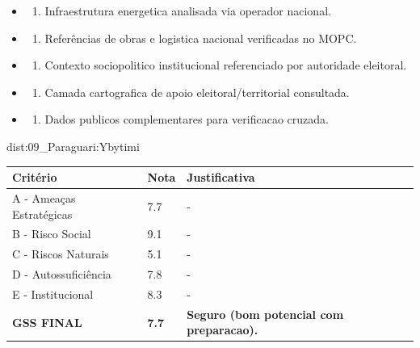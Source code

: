 {\begin{itemize}
\item
  \begin{enumerate}
  \def\labelenumi{\arabic{enumi})}
  \setcounter{enumi}{7}
  \tightlist
  \item
    Infraestrutura energetica analisada via operador nacional.
  \end{enumerate}
\item
  \begin{enumerate}
  \def\labelenumi{\arabic{enumi})}
  \setcounter{enumi}{8}
  \tightlist
  \item
    Referências de obras e logistica nacional verificadas no MOPC.
  \end{enumerate}
\item
  \begin{enumerate}
  \def\labelenumi{\arabic{enumi})}
  \setcounter{enumi}{9}
  \tightlist
  \item
    Contexto sociopolitico institucional referenciado por autoridade
    eleitoral.
  \end{enumerate}
\item
  \begin{enumerate}
  \def\labelenumi{\arabic{enumi})}
  \setcounter{enumi}{10}
  \tightlist
  \item
    Camada cartografica de apoio eleitoral/\allowbreak territorial consultada.
  \end{enumerate}
\item
  \begin{enumerate}
  \def\labelenumi{\arabic{enumi})}
  \setcounter{enumi}{11}
  \tightlist
  \item
    Dados publicos complementares para verificacao cruzada.
  \end{enumerate}
\end{itemize}}{dist:09_Paraguari:Ybytimi}
\begin{table}[ht!]
\small \begin{tabular}{p{3.0cm}p{0.8cm}p{6.0cm}} \toprule
\textbf{Critério} & \textbf{Nota} & \textbf{Justificativa} \\ \midrule
A - Ameaças Estratégicas & 7.7 & - \\
B - Risco Social & 9.1 & - \\
C - Riscos Naturais & 5.1 & - \\
D - Autossuficiência & 7.8 & - \\
E - Institucional & 8.3 & - \\
\midrule \textbf{GSS FINAL} & \textbf{7.7} & \textbf{Seguro (bom potencial com preparacao).} \\ \bottomrule \end{tabular}
\end{table}
